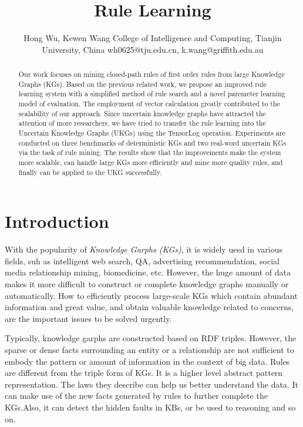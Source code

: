 \documentclass{article}
\title{Rule Learning}
\author{
	Hong Wu, Kewen Wang
	\affiliations
	College of Intelligence and Computing, Tianjin University, China \emails
	wh0625@tju.edu.cn, k.wang@griffith.edu.au
}
\begin{document}
	\maketitle
	
	\begin{abstract}
		Our work focuses on mining closed-path rules of first order rules from large Knowledge Graphs (KGs). Based on the previous related work, we propose an improved rule learning system with a simplified method of rule search and a novel  paremeter learning model of evaluation. The employment of vector calculation greatly contributed to the scalability of our approach. 
		Since uncertain knowledge graphs have attracted the attention of more researchers, we have tried to transfer the rule learning into the Uncertain Knowledge Graphs (UKGs) using the TensorLog operation. 
		Experiments are conducted on three benchmarks of deterministic KGs and two real-word uncertain KGs via the task of rule mining. The results show that the improvements make the system more scalable, can handle large KGs more efficiently and mine more quality rules, and finally can be applied to the UKG successfully.
	\end{abstract}
	
	
	\section{Introduction}
	With the popularity of {\em Knowledge Garphs (KGs)}, it is widely uesd in various fields, suh as  intelligent web search, QA, advertising recommendation, social media relationship mining, biomedicine, etc. 
	However, the huge amount of data makes it more difficult to construct or complete knowledge graphs manually or automatically.
	How to efficiently process large-scale KGs which contain abundant information and great value, and obtain valuable knowledge related to concerns, are the important issues to be solved urgently.
	
	Typically, knowledge garphs are constructed based on RDF triples. However, the sparse or dense facts surrounding an entity or a relationship are not sufficient to embody the pattern or amount of information in the context of big data.
	Rules are different from the triple form of KGs. It is a higher level abstract pattern representation. The laws they describe can help us better understand the data. It can make use of the new facts generated by rules to further complete the KGs.Also, it can detect the hidden faults in KBs, or be used to reasoning and so on. 
	
\end{document}
